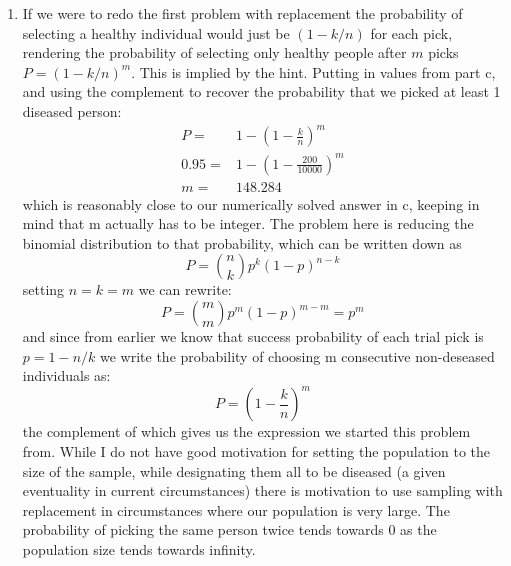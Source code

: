 \documentclass{article}
\newcommand{\1}{\mathbf{1}}
\begin{document}
\begin{enumerate}
    
    \item If we were to redo the first problem with replacement the probability of selecting a healthy individual would just be $(1-k/n)$ for each pick, rendering the probability of selecting only healthy people after $m$ picks $P=(1-k/n)^m$. This is implied by the hint. Putting in values from part c, and using the complement to recover the probability that we picked at least 1 diseased person:
    \begin{align*}
    P =& 1 - \left(1-\frac{k}{n}\right)^m \\
    0.95 =& 1 - \left(1-\frac{200}{10000}\right)^m \\
    m =& 148.284
    \end{align*}
    which is reasonably close to our numerically solved answer in c, keeping in mind that m actually has to be integer. The problem here is reducing the binomial distribution to that probability, which can be written down as
    $$P = {n \choose k} p^k (1-p)^{n-k}$$
    setting $n=k=m$ we can rewrite:
    $$P = {m \choose m} p^m (1-p)^{m-m} = p^m$$
    and since from earlier we know that success probability of each trial pick is $p=1-n/k$ we write the probability of choosing m consecutive non-deseased individuals as:
    $$P = \left(1-\frac{k}{n}\right)^m$$
    the complement of which gives us the expression we started this problem from. While I do not have good motivation for setting the population to the size of the sample, while designating them all to be diseased (a given eventuality in current circumstances) there is motivation to use sampling with replacement in circumstances where our population is very large. The probability of picking the same person twice tends towards 0 as the population size tends towards infinity.
\end{enumerate}




\newpage
\end{document}
